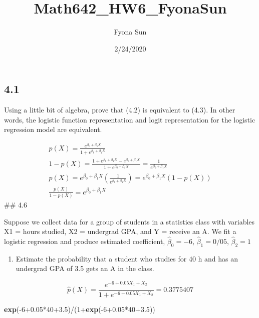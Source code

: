 \documentclass[]{article}
\title{Math642\_HW6\_FyonaSun}
\author{Fyona Sun}
\date{2/24/2020}
\newenvironment{Shaded}{\begin{snugshade}}{\end{snugshade}}
\newcommand{\KeywordTok}[1]{\textcolor[rgb]{0.13,0.29,0.53}{\textbf{{#1}}}}
\newcommand{\DecValTok}[1]{\textcolor[rgb]{0.00,0.00,0.81}{{#1}}}
\newcommand{\FloatTok}[1]{\textcolor[rgb]{0.00,0.00,0.81}{{#1}}}
\newcommand{\NormalTok}[1]{{#1}}
\providecommand{\tightlist}{%
  \setlength{\itemsep}{0pt}\setlength{\parskip}{0pt}}
\begin{document}
\maketitle

\subsection{4.1}\label{section}

Using a little bit of algebra, prove that (4.2) is equivalent to (4.3).
In other words, the logistic function representation and logit
representation for the logistic regression model are equivalent.

\[\begin{align*}
p(X) = \frac{e^{\beta_0+\beta_1X}}{1+e^{\beta_0+\beta_1X}}\\
1-p(X) =  \frac{1+e^{\beta_0+\beta_1X}-e^{\beta_0+\beta_1X}}{1+e^{\beta_0+\beta_1X}} = \frac{1}{e^{\beta_0+\beta_1X}}\\
p(X) = e^{\beta_0+\beta_1X} (\frac{1}{e^{\beta_0+\beta_1X}})=e^{\beta_0+\beta_1X} (1-p(X))\\
\frac{p(X)}{1-p(X)}=e^{\beta_0+\beta_1X}
\end{align*}\] \#\# 4.6

Suppose we collect data for a group of students in a statistics class
with variables X1 = hours studied, X2 = undergrad GPA, and Y = receive
an A. We fit a logistic regression and produce estimated coefficient,
\(\hat \beta_0 = -6\), \(\hat \beta_1 = 0/05\), \(\hat \beta_2 = 1\)

\begin{enumerate}
\def\labelenumi{(\alph{enumi})}
\tightlist
\item
  Estimate the probability that a student who studies for 40 h and has
  an undergrad GPA of 3.5 gets an A in the class.
\end{enumerate}

\[\hat p(X) = \frac{e^{-6+0.05X_1+X_2}}{1+e^{-6+0.05X_1+X_2}}=0.3775407\]

\begin{Shaded}
\begin{Highlighting}[]
\KeywordTok{exp}\NormalTok{(-}\DecValTok{6}\FloatTok{+0.05}\NormalTok{*}\DecValTok{40}\FloatTok{+3.5}\NormalTok{)/(}\DecValTok{1}\NormalTok{+}\KeywordTok{exp}\NormalTok{(-}\DecValTok{6}\FloatTok{+0.05}\NormalTok{*}\DecValTok{40}\FloatTok{+3.5}\NormalTok{))}
\end{Highlighting}
\end{Shaded}
\end{document}
